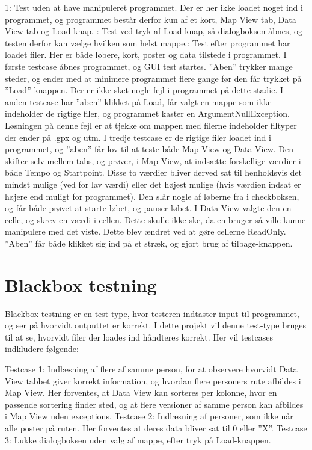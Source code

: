 1: Test uden at have manipuleret programmet. Der er her ikke loadet noget ind i programmet, og programmet består derfor kun af et kort, Map View tab, Data View tab og Load-knap. : Test ved tryk af Load-knap, så dialogboksen åbnes, og testen derfor kan vælge hvilken som helst mappe.: Test efter programmet har loadet filer. Her er både løbere, kort, poster og data tilstede i programmet.\newline
I første testcase åbnes programmet, og GUI test startes. ”Aben” trykker mange steder, og ender med at minimere programmet flere gange før den får trykket på ”Load”-knappen. Der er ikke sket nogle fejl i programmet på dette stadie.\newline
I anden testcase har ”aben” klikket på Load, får valgt en mappe som ikke indeholder de rigtige filer, og programmet kaster en ArgumentNullException. Løsningen på denne fejl er at tjekke om mappen med filerne indeholder filtyper der ender på .gpx og utm. \newline
I tredje testcase er de rigtige filer loadet ind i programmet, og ”aben” får lov til at teste både Map View og Data View. Den skifter selv mellem tabs, og prøver, i Map View, at indsætte forskellige værdier i både Tempo og Startpoint. Disse to værdier bliver derved sat til henholdsvis det mindst mulige (ved for lav værdi) eller det højest mulige (hvis værdien indsat er højere end muligt for programmet). Den slår nogle af løberne fra i checkboksen, og får både prøvet at starte løbet, og pauser løbet. I Data View valgte den en celle, og skrev en værdi i cellen. Dette skulle ikke ske, da en bruger så ville kunne manipulere med det viste. Dette blev ændret ved at gøre cellerne ReadOnly. ”Aben” får både klikket sig ind på et stræk, og gjort brug af tilbage-knappen.

\section{Blackbox testning}
Blackbox testning er en test-type, hvor testeren indtaster input til programmet, og ser på hvorvidt outputtet er korrekt. I dette projekt vil denne test-type bruges til at se, hvorvidt filer der loades ind håndteres korrekt. Her vil testcases indkludere følgende:

Testcase 1: Indlæsning af flere af samme person, for at observere hvorvidt Data View tabbet giver korrekt information, og hvordan flere personers rute afbildes i Map View. Her forventes, at Data View kan sorteres per kolonne, hvor en passende sortering finder sted, og at flere versioner af samme person kan afbildes i Map View uden exceptions.\newline
Testcase 2: Indlæsning af personer, som ikke når alle poster på ruten. Her forventes at deres data bliver sat til 0 eller ”X”.\newline
Testcase 3: Lukke dialogboksen uden valg af mappe, efter tryk på Load-knappen.\newline

